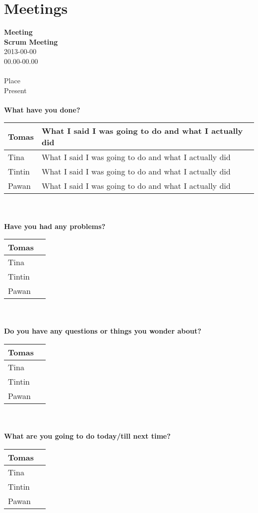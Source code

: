 \documentclass{report}
\begin{document}
\section{Meetings}
\textbf{Meeting}\\
\textbf{Scrum Meeting}\\
2013-00-00\\
00.00-00.00\\\\
Place\\
Present\\\\
\textbf{What have you done?}\\
\begin{tabular}{| l | p{9 cm} |} \hline
Tomas & What I said I was going to do and what I actually did \\ \hline
Tina & What I said I was going to do and what I actually did  \\ \hline
Tintin & What I said I was going to do and what I actually did  \\ \hline
Pawan & What I said I was going to do and what I actually did  \\ \hline
\end{tabular}\\\\
\textbf{Have you had any problems?}\\
\begin{tabular}{| l | p{9 cm} |} \hline
Tomas & \\ \hline
Tina &  \\ \hline
Tintin &  \\ \hline
Pawan &  \\ \hline
\end{tabular}\\\\
\textbf{Do you have any questions or things you wonder about?}\\
\begin{tabular}{| l | p{9 cm} |} \hline
Tomas & \\ \hline
Tina &  \\ \hline
Tintin &  \\ \hline
Pawan &  \\ \hline
\end{tabular}\\\\
\textbf{What are you going to do today/till next time?}\\
\begin{tabular}{| l | p{9 cm} |} \hline
Tomas & \\ \hline
Tina &  \\ \hline
Tintin &  \\ \hline
Pawan &  \\ \hline
\end{tabular}
\end{document}
